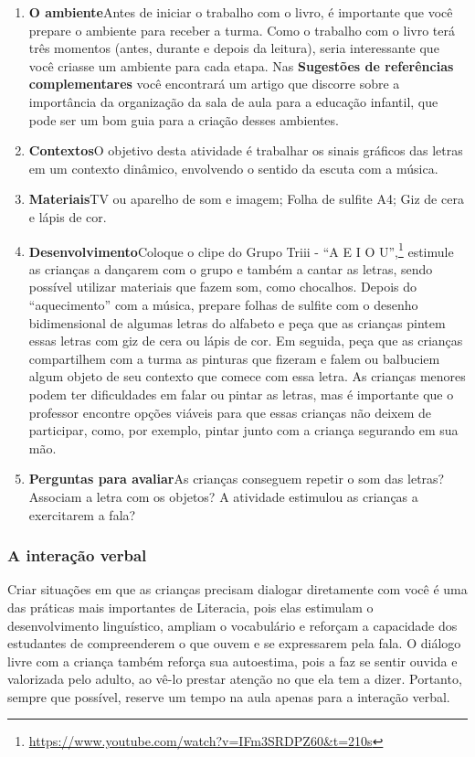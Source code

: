 \documentclass[11pt]{extarticle}
\begin{document}
\begin{enumerate}
\item \textbf{O ambiente}\quad Antes de iniciar o trabalho com o livro, é importante que você 
prepare o ambiente para receber a turma. Como o trabalho com o livro terá 
três momentos (antes, durante e depois da leitura), seria interessante que você 
criasse um ambiente para cada etapa. Nas \textbf{Sugestões de referências complementares} 
você encontrará um artigo que discorre sobre a importância da organização da sala 
de aula para a educação infantil, que pode ser um bom guia para a criação desses 
ambientes.

\item \textbf{Contextos}\quad O objetivo desta atividade é trabalhar os sinais gráficos das letras em um contexto dinâmico, envolvendo o sentido da escuta com a música.


\item \textbf{Materiais}\quad TV ou aparelho de som e imagem; Folha de sulfite A4; Giz de cera e lápis de cor. 

\item \textbf{Desenvolvimento}\quad Coloque o clipe do Grupo Triii - “A E I O U”,\footnote{\url{https://www.youtube.com/watch?v=IFm3SRDPZ60&t=210s}} estimule as crianças a dançarem com o grupo e também a cantar as letras, sendo possível utilizar materiais que fazem som, como chocalhos. Depois do ``aquecimento'' com a música, prepare folhas de sulfite com o desenho bidimensional de algumas letras do alfabeto e peça que as crianças pintem essas letras com giz de cera ou lápis de cor. Em seguida, peça que as crianças compartilhem com a turma as pinturas que fizeram e falem ou balbuciem algum objeto de seu contexto que comece com essa letra. As crianças menores podem ter dificuldades em falar ou pintar as letras, mas é importante que o professor encontre opções viáveis para que essas crianças não deixem de participar, como, por exemplo, pintar junto com a criança segurando em sua mão.

\item \textbf{Perguntas para avaliar}\quad As crianças conseguem repetir o som das letras? Associam a letra com os objetos? A atividade estimulou as crianças a exercitarem a fala?
\end{enumerate}


\subsubsection{A interação verbal} 
Criar situações em que as crianças precisam dialogar diretamente com 
você é uma das práticas mais importantes de Literacia, pois elas estimulam 
o desenvolvimento linguístico, ampliam o vocabulário e reforçam a 
capacidade dos estudantes de compreenderem o que ouvem e se expressarem 
pela fala. O diálogo livre com a criança também reforça sua autoestima, pois 
a faz se sentir ouvida e valorizada pelo adulto, ao vê-lo prestar atenção 
no que ela tem a dizer. Portanto, sempre que possível, reserve um tempo na 
aula apenas para a interação verbal. 
\end{document}
